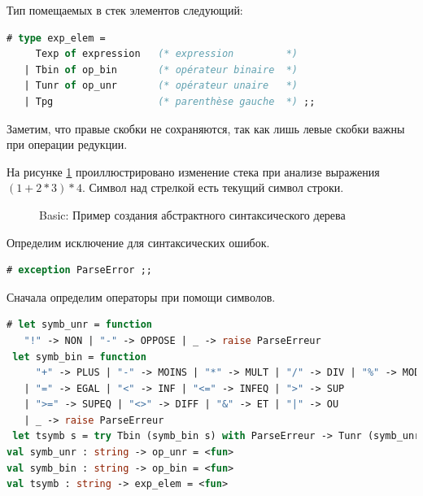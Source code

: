 Тип помещаемых в стек элементов следующий:

\begin{lstlisting}[language=OCaml]
# type exp_elem = 
     Texp of expression   (* expression         *)
   | Tbin of op_bin       (* opérateur binaire  *)
   | Tunr of op_unr       (* opérateur unaire   *)
   | Tpg                  (* parenthèse gauche  *) ;;
\end{lstlisting}

Заметим, что правые скобки не сохраняются, так как лишь левые скобки важны при 
операции редукции.

На рисунке \ref{fig:basic_abstract_syntax_tree_construction_example} 
проиллюстрировано изменение стека при анализе выражения $(1 + 2 * 3) * 4$. 
Символ над стрелкой есть текущий символ строки.

\begin{figure}[h]
	\caption{\label{fig:basic_abstract_syntax_tree_construction_example}Basic: 
Пример создания абстрактного синтаксического дерева}
\end{figure}

Определим исключение для синтаксических ошибок.

\begin{lstlisting}[language=OCaml]
# exception ParseError ;;
\end{lstlisting}

Сначала определим операторы при помощи символов.

\begin{lstlisting}[language=OCaml]
# let symb_unr = function 
   "!" -> NON | "-" -> OPPOSE | _ -> raise ParseErreur 
 let symb_bin = function
     "+" -> PLUS | "-" -> MOINS | "*" -> MULT | "/" -> DIV | "%" -> MOD 
   | "=" -> EGAL | "<" -> INF | "<=" -> INFEQ | ">" -> SUP 
   | ">=" -> SUPEQ | "<>" -> DIFF | "&" -> ET | "|" -> OU 
   | _ -> raise ParseErreur 
 let tsymb s = try Tbin (symb_bin s) with ParseErreur -> Tunr (symb_unr s) ;;
val symb_unr : string -> op_unr = <fun>
val symb_bin : string -> op_bin = <fun>
val tsymb : string -> exp_elem = <fun>
\end{lstlisting}

